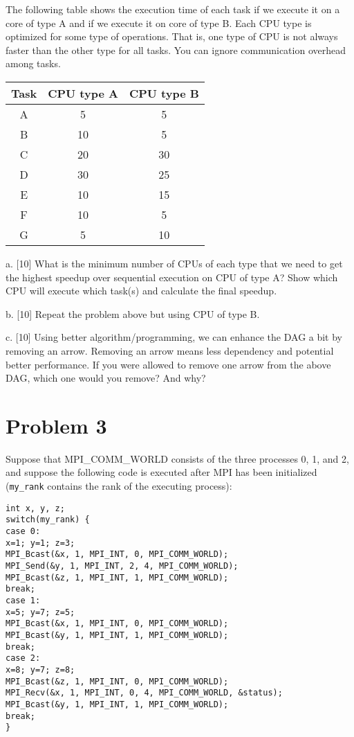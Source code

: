 \documentclass{article}
\begin{document}
The following table shows the execution time of each task if we execute it on a core of type A and if we execute it on core of type B. Each CPU type is optimized for some type of operations. That is, one type of CPU is not always faster than the other type for all tasks. You can ignore communication overhead among tasks.

\begin{tabular}{|c|c|c|}
\hline
Task & CPU type A & CPU type B \\ \hline
A & 5 & 5 \\ \hline
B & 10 & 5 \\ \hline
C & 20 & 30 \\ \hline
D & 30 & 25 \\ \hline
E & 10 & 15 \\ \hline
F & 10 & 5 \\ \hline
G & 5 & 10 \\ \hline
\end{tabular}

a. [10] What is the minimum number of CPUs of each type that we need to get the highest speedup over sequential execution on CPU of type A? Show which CPU will execute which task(s) and calculate the final speedup.

b. [10] Repeat the problem above but using CPU of type B.

c. [10] Using better algorithm/programming, we can enhance the DAG a bit by removing an arrow. Removing an arrow means less dependency and potential better performance. If you were allowed to remove one arrow from the above DAG, which one would you remove? And why?


\section*{Problem 3}
Suppose that MPI\_COMM\_WORLD consists of the three processes 0, 1, and 2, and suppose the following code is executed after MPI has been initialized (\texttt{my\_rank} contains the rank of the executing process):

\begin{verbatim}
int x, y, z;
switch(my_rank) {
case 0:
x=1; y=1; z=3;
MPI_Bcast(&x, 1, MPI_INT, 0, MPI_COMM_WORLD);
MPI_Send(&y, 1, MPI_INT, 2, 4, MPI_COMM_WORLD);
MPI_Bcast(&z, 1, MPI_INT, 1, MPI_COMM_WORLD);
break;
case 1:
x=5; y=7; z=5;
MPI_Bcast(&x, 1, MPI_INT, 0, MPI_COMM_WORLD);
MPI_Bcast(&y, 1, MPI_INT, 1, MPI_COMM_WORLD);
break;
case 2:
x=8; y=7; z=8;
MPI_Bcast(&z, 1, MPI_INT, 0, MPI_COMM_WORLD);
MPI_Recv(&x, 1, MPI_INT, 0, 4, MPI_COMM_WORLD, &status);
MPI_Bcast(&y, 1, MPI_INT, 1, MPI_COMM_WORLD);
break;
}
\end{verbatim}
\end{document}
